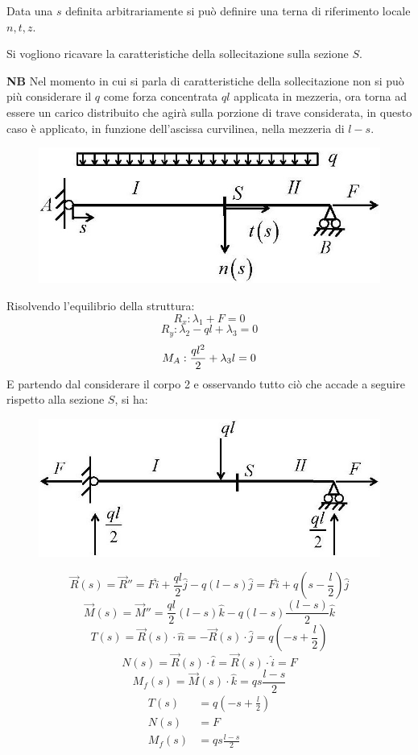 \documentclass{article}
\begin{document}
\begin{adjustwidth}{2in}{}
	Data una $s$ definita arbitrariamente si può definire una terna di riferimento locale $n, t, z$. 
	
	Si vogliono ricavare la caratteristiche della sollecitazione sulla sezione $S$. \newline 
	
	\textbf{NB} Nel momento in cui si parla di caratteristiche della sollecitazione non si può più considerare il $q$ come forza concentrata $ql$ applicata in mezzeria, ora torna ad essere un carico distribuito che agirà sulla porzione di trave considerata, in questo caso è applicato, in funzione dell'ascissa curvilinea, nella mezzeria di $l-s$.
	
\begin{figure}[H]
	\centering
	\includegraphics[width=0.3\linewidth]{"immagini/1.PARTE5_Pagina_05 (2)"}
\end{figure}

	Risolvendo l'equilibrio della struttura:
	\[R_x:\lambda_1 + F = 0\] 
	\[R_y: \lambda_2 - ql+\lambda_3 = 0\]
	\[M_A: {ql^2\over2} + \lambda_3l = 0\]
	E partendo dal considerare il corpo 2 e osservando tutto ciò che accade a seguire rispetto alla sezione $S$, si ha: 
	
\begin{figure}[H]
	\centering
	\includegraphics[width=0.3\linewidth]{"immagini/1.PARTE5_Pagina_05"}
\end{figure}

	\[\vec{R}(s) = \vec{R}'' = F\hat{i} + \frac{ql}{2} \hat{j} - q(l-s) \hat{j} = F\hat{i} + q\left( s- \frac{l}{2}\right) \hat{j}	\]	
	\[\vec{M}(s) = \vec{M}'' =\frac{ql}{2}(l-s) \hat{k}  - q(l-s)\frac{(l-s)}{2} \hat{k}	\]	
	\[
	T(s) = \vec{R}(s) \cdot \hat{n} = -\vec{R}(s) \cdot \hat{j} = q\left( -s + \frac{l}{2}\right) 
	\]
	\[
	N(s) = \vec{R}(s) \cdot \hat{t} = \vec{R}(s) \cdot \hat{i} = F
	\]
	\[
	M_f(s) = \vec{M}(s) \cdot \hat{k} = qs \frac{l-s}{2}
	\]
	\[\boxed{\begin{aligned}
	T(s) & =  q\left( -s + \frac{l}{2}\right)  \\ N(s) & =  F \\ M_f(s) & = qs \frac{l-s}{2}
	\end{aligned}}\] 


\end{adjustwidth}
\end{document}
